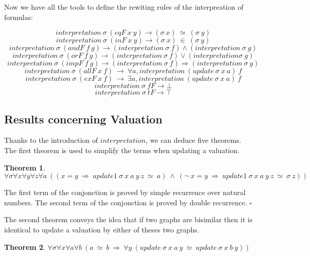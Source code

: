 \documentclass[submission,copyright,creativecommons]{eptcs}
\def\lra{\longrightarrow}
\def\imp{\mathbin{\Rightarrow}}
\def\fa{{\forall}}
\def\bltop{{\top}}
\def\blbot{{\bot}}
\DeclareMathOperator{\blneg}{{\neg}}
\def\conj{\mathbin{\wedge}}
\def\disj{\mathbin{\vee}}
\def\ex{{\exists}}
\newtheorem{theorem}{Theorem}[section]
\newenvironment{proof}{\noindent {\em Proof.}}{\medskip}
\begin{document}
Now we have all the tools to define the rewiting rules of the interpreation of formulas:

$$interpretation \ \sigma \ (eqF \ x \ y) \lra (\sigma \ x) \ \simeq \ (\sigma \ y)$$
$$interpretation \ \sigma \ (inF \ x \ y) \lra (\sigma \ x) \ \in \ (\sigma \ y)$$
$$interpretation \ \sigma \ (andF \ f \ g) \lra (interpretation \ \sigma \ f) \conj (interpretation \ \sigma \ g)$$
$$interpretation \ \sigma \ (orF \ f \ g) \lra (interpretation \ \sigma \ f) \disj  (interpretation \sigma \ g)$$
$$interpretation \ \sigma \ (impF \ f \ g) \lra (interpretation \ \sigma \ f) \imp (interpretation \ \sigma \ g)$$
$$interpretation \ \sigma \ (allF \ x \ f) \ \lra \ \fa a, interpretation \ (update \ \sigma \ x \ a) \ f$$
$$interpretation \ \sigma \ (exF \ x \ f) \ \lra \ \ex a, interpretation \ (update \ \sigma \ x \ a) \ f$$
$$interpretation \ \sigma \ fF \lra \blbot$$
$$interpretation \ \sigma \ tF \lra \bltop$$

\subsection{Results concerning Valuation}

Thanks to the introduction of $interpretation$, we can deduce five theorems. \\

The first theorem is used to simplify the terms when updating a valuation.

\begin{theorem}
$\fa \sigma \fa x \fa y \fa z \fa a ~((x = y \ \imp \ update1 \ \sigma \ x \ a \ y \ z \ \simeq \ a) \ \conj \ (\blneg \ x = y \ \imp \ update1 \ \sigma \ x \ a \ y \ z \ \simeq \ \sigma \ z))$
\end{theorem}

\begin{proof}
The first term of the conjonction is proved by simple recurrence over natural numbers. The second term of the conjonction is proved by double recurrence. $\square$
\end{proof}

The second theorem conveys the idea that if two graphs are bisimilar then it is identical to update a valuation by either of theses two graphs.

\begin{theorem}
$\fa \sigma \fa x \fa a \fa b ~(a \ \simeq \ b \ \imp \ \fa y ~(update \ \sigma \ x \ a \ y \ \simeq \ update \ \sigma \ x \ b \ y))$
\end{theorem}
\end{document}

